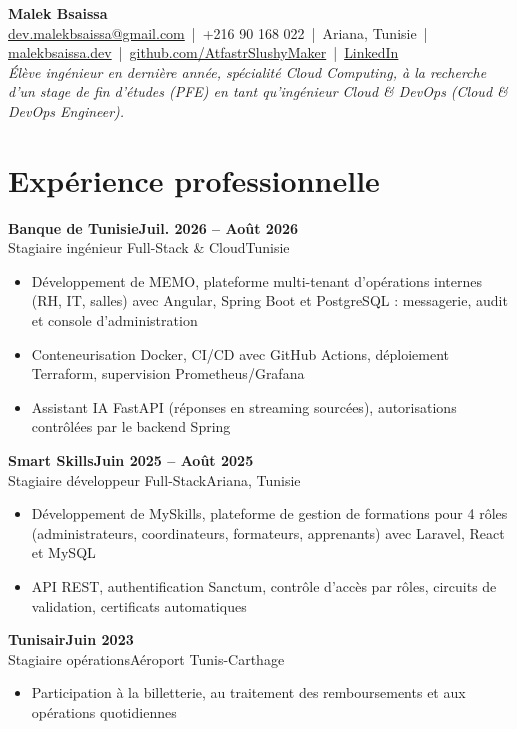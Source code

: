 \documentclass[10pt]{article}
\newcommand{\entry}[4]{%
  \textbf{#1}\hfill\textbf{#2}\\
  #3\hfill #4\vspace{-1pt}}
\newcommand{\gap}{\vspace{3pt}}
\begin{document}
{\fontsize{26}{28}\selectfont\bfseries Malek Bsaissa}\\[3pt]
\href{mailto:dev.malekbsaissa@gmail.com}{dev.malekbsaissa@gmail.com} \,|\, +216 90 168 022 \,|\, Ariana, Tunisie \,|\,
\href{https://malekbsaissa.dev}{malekbsaissa.dev} \,|\,
\href{https://github.com/AtfastrSlushyMaker}{github.com/AtfastrSlushyMaker} \,|\,
\href{https://www.linkedin.com/in/malek-bsaissa-8861b229b/}{LinkedIn}\\[2pt]
\textit{Élève ingénieur en dernière année, spécialité Cloud Computing, à la recherche d'un stage de fin d'études (PFE) en tant qu'ingénieur Cloud \& DevOps (Cloud \& DevOps Engineer).}

\section{Expérience professionnelle}

\entry{Banque de Tunisie}{Juil. 2026 -- Août 2026}{Stagiaire ingénieur Full-Stack \& Cloud}{Tunisie}
\begin{itemize}
  \item Développement de MEMO, plateforme multi-tenant d'opérations internes (RH, IT, salles) avec Angular, Spring Boot et PostgreSQL : messagerie, audit et console d'administration
  \item Conteneurisation Docker, CI/CD avec GitHub Actions, déploiement Terraform, supervision Prometheus/Grafana
  \item Assistant IA FastAPI (réponses en streaming sourcées), autorisations contrôlées par le backend Spring
\end{itemize}
\gap

\entry{Smart Skills}{Juin 2025 -- Août 2025}{Stagiaire développeur Full-Stack}{Ariana, Tunisie}
\begin{itemize}
  \item Développement de MySkills, plateforme de gestion de formations pour 4 rôles (administrateurs, coordinateurs, formateurs, apprenants) avec Laravel, React et MySQL
  \item API REST, authentification Sanctum, contrôle d'accès par rôles, circuits de validation, certificats automatiques
\end{itemize}
\gap

\entry{Tunisair}{Juin 2023}{Stagiaire opérations}{Aéroport Tunis-Carthage}
\begin{itemize}
  \item Participation à la billetterie, au traitement des remboursements et aux opérations quotidiennes
\end{itemize}
\end{document}
